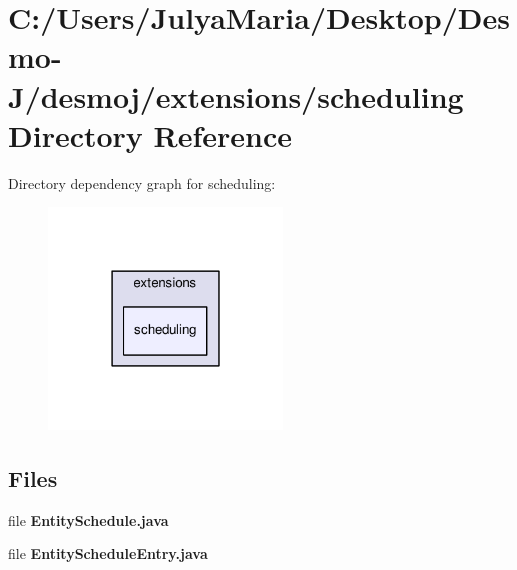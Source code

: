 \section{C\-:/\-Users/\-Julya\-Maria/\-Desktop/\-Desmo-\/\-J/desmoj/extensions/scheduling Directory Reference}
\label{dir_cf5e3d0ad6acd07d611bc454bd8bc558}
Directory dependency graph for scheduling\-:
\nopagebreak
\begin{figure}[H]
\begin{center}
\leavevmode
\includegraphics[width=176pt]{dir_cf5e3d0ad6acd07d611bc454bd8bc558_dep}
\end{center}
\end{figure}
\subsection*{Files}
\begin{DoxyCompactItemize}
\item 
file {\bfseries Entity\-Schedule.\-java}
\item 
file {\bfseries Entity\-Schedule\-Entry.\-java}
\end{DoxyCompactItemize}
